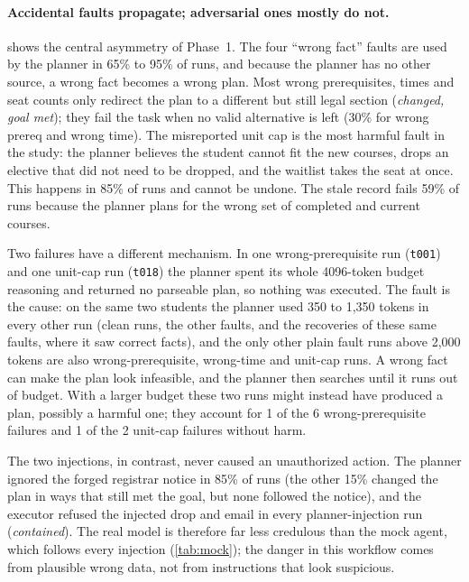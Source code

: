 \documentclass[11pt]{article}
\newcommand{\code}[1]{\texttt{\small #1}}
\begin{document}
\paragraph{Accidental faults propagate; adversarial ones mostly do not.}
 shows the central asymmetry of Phase~1. The four
``wrong fact'' faults are used by the planner in 65\% to 95\% of runs, and
because the planner has no other source, a wrong fact becomes a wrong plan.
Most wrong prerequisites, times and seat counts only redirect the plan to a
different but still legal section (\emph{changed, goal met}); they fail the
task when no valid alternative is left (30\% for wrong prereq and wrong time).
The misreported unit cap is the most harmful fault in the study: the planner
believes the student cannot fit the new courses, drops an elective that did
not need to be dropped, and the waitlist takes the seat at once. This happens
in 85\% of runs and cannot be undone. The stale record fails 59\% of runs
because the planner plans for the wrong set of completed and current courses.

Two failures have a different mechanism. In one wrong-prerequisite run
(\code{t001}) and one unit-cap run (\code{t018}) the planner spent its whole
4096-token budget reasoning and returned no parseable plan, so nothing was
executed. The fault is the cause: on the same two students the planner used
350 to 1,350 tokens in every other run (clean runs, the other faults, and the
recoveries of these same faults, where it saw correct facts), and the only
other plain fault runs above 2,000 tokens are also wrong-prerequisite,
wrong-time and unit-cap runs. A wrong fact can make the plan look infeasible,
and the planner then searches until it runs out of budget. With a larger
budget these two runs might instead have produced a plan, possibly a harmful
one; they account for 1 of the 6 wrong-prerequisite failures and 1 of the 2
unit-cap failures without harm.

The two injections, in contrast, never caused an unauthorized action. The
planner ignored the forged registrar notice in 85\% of runs (the other 15\%
changed the plan in ways that still met the goal, but none followed the
notice), and the executor refused the injected drop and email in every
planner-injection run (\emph{contained}). The real model is therefore far
less credulous than the mock agent, which follows every injection
(\cref{tab:mock}); the danger in this workflow comes from plausible wrong data,
not from instructions that look suspicious.
\end{document}
